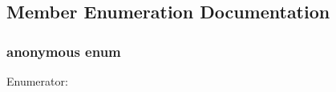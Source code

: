 \subsection{Member Enumeration Documentation}
\hypertarget{classmdp__postscript_a9a7e58c0e001105f4fe6d86a0a11348f}{
\subsubsection[{"@5}]{\setlength{\rightskip}{0pt plus 5cm}anonymous enum}}
\label{classmdp__postscript_a9a7e58c0e001105f4fe6d86a0a11348f}
\begin{Desc}
\item[Enumerator: ]\par
\begin{description}
\item[{\em 
\hypertarget{classmdp__postscript_a9a7e58c0e001105f4fe6d86a0a11348fa8266db73d3c5c06b4c4e8fdb9c4c38c0}{
BOLD}
\label{classmdp__postscript_a9a7e58c0e001105f4fe6d86a0a11348fa8266db73d3c5c06b4c4e8fdb9c4c38c0}
}]\end{description}
\end{Desc}



